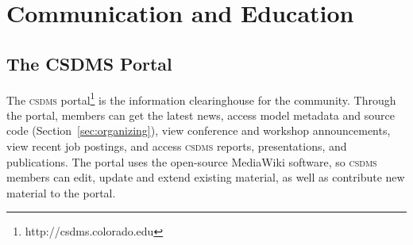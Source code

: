 \documentclass[11pt, oneside]{amsart}
\DeclareRobustCommand{\csdms}{\textsc{csdms}}
\DeclareRobustCommand{\wmt}{\textsc{wmt}}
\begin{document}

\section{Communication and Education}
\label{sec:education}


\subsection{The CSDMS Portal}

The \csdms{} portal\footnote{http://csdms.colorado.edu}
is the information clearinghouse for the community.
Through the portal,
members can get the latest news,
access model metadata and source code (Section~\ref{sec:organizing}),
view conference and workshop announcements,
view recent job postings,
and access \csdms{} reports, presentations, and publications.
The portal uses the open-source MediaWiki software,
so \csdms{} members can edit, update and extend existing material,
as well as contribute new material to the portal.
\end{document}
